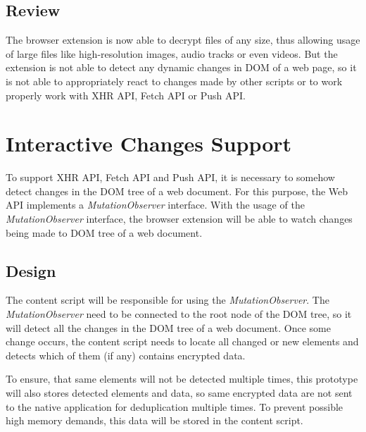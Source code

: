 \subsection{Review}
The browser extension is now able to decrypt files of any size, thus allowing usage of large files like high-resolution images, audio tracks or even videos. But the extension is not able to detect any dynamic changes in DOM of a web page, so it is not able to appropriately react to changes made by other scripts or to work properly work with XHR API, Fetch API or Push API.

\section{Interactive Changes Support}
To support XHR API, Fetch API and Push API, it is necessary to somehow detect changes in the DOM tree of a web document. For this purpose, the Web API implements a \textit{MutationObserver} interface. With the usage of the \textit{MutationObserver} interface, the browser extension will be able to watch changes being made to DOM tree of a web document.

\subsection{Design}
The content script will be responsible for using the \textit{MutationObserver}. The \textit{MutationObserver} need to be connected to the root node of the DOM tree, so it will detect all the changes in the DOM tree of a web document. Once some change occurs, the content script needs to locate all changed or new elements and detects which of them (if any) contains encrypted data.

To ensure, that same elements will not be detected multiple times, this prototype will also stores detected elements and data, so same encrypted data are not sent to the native application for deduplication multiple times. To prevent possible high memory demands, this data will be stored in the content script.

